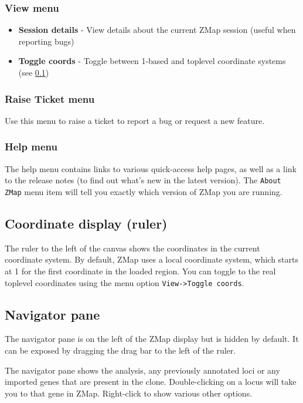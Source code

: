 \documentclass[letterpaper]{article}
\begin{document}
\subsubsection{View menu}
\begin{itemize}
\item \textbf{Session details} - View details about the current ZMap session (useful when reporting bugs)
\item \textbf{Toggle coords} - Toggle between 1-based and toplevel coordinate systems (see \ref{sec_ruler})
\end{itemize}

\subsubsection{Raise Ticket menu}
Use this menu to raise a ticket to report a bug or request a new feature.

\subsubsection{Help menu}
The help menu contains links to various quick-access help pages, as well as a link to the release notes (to find out what's new in the latest version). The \lstinline{About ZMap} menu item will tell you exactly which version of ZMap you are running.


\subsection{Coordinate display (ruler)} \label{sec_ruler}
The ruler to the left of the canvas shows the coordinates in the current coordinate system. By default, ZMap uses a local coordinate system, which starts at 1 for the first coordinate in the loaded region. You can toggle to the real toplevel coordinates using the menu option \lstinline{View->Toggle coords}.


\subsection{Navigator pane}
The navigator pane is on the left of the ZMap display but is hidden by default. It can be exposed by dragging the drag bar to the left of the ruler.

The navigator pane shows the analysis, any previously annotated loci or any imported genes that are present in the clone. Double-clicking on a locus will take you to that gene in ZMap. Right-click to show various other options.
\end{document}
